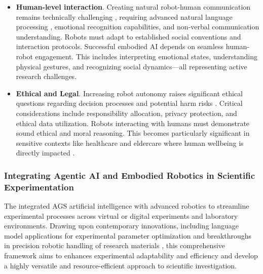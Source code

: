 \begin{itemize}
    \item \textbf{Human-level interaction}. Creating natural robot-human communication remains technically challenging \cite{ajoudani2018progress}, requiring advanced natural language processing \cite{ren2023robots}, emotional recognition capabilities, and non-verbal communication understanding. Robots must adapt to established social conventions and interaction protocols. Successful embodied AI depends on seamless human-robot engagement. This includes interpreting emotional states, understanding physical gestures, and recognizing social dynamics—all representing active research challenges.
    
    \item \textbf{Ethical and Legal}. Increasing robot autonomy raises significant ethical questions regarding decision processes and potential harm risks \cite{valluri2024exploring}. Critical considerations include responsibility allocation, privacy protection, and ethical data utilization. Robots interacting with humans must demonstrate sound ethical and moral reasoning. This becomes particularly significant in sensitive contexts like healthcare and eldercare where human wellbeing is directly impacted \cite{elendu2023ethical}.
    
\end{itemize}



\subsubsection*{Integrating Agentic AI and Embodied Robotics in Scientific Experimentation}

The integrated AGS artificial intelligence with advanced robotics to streamline experimental processes across virtual or digital experiments and laboratory environments. Drawing upon contemporary innovations, including language model applications for experimental parameter optimization \cite{ma2024llm} and breakthroughs in precision robotic handling of research materials \cite{li2024chemistry3d}, this comprehensive framework aims to enhances experimental adaptability and efficiency and develop a highly versatile and resource-efficient approach to scientific investigation.

